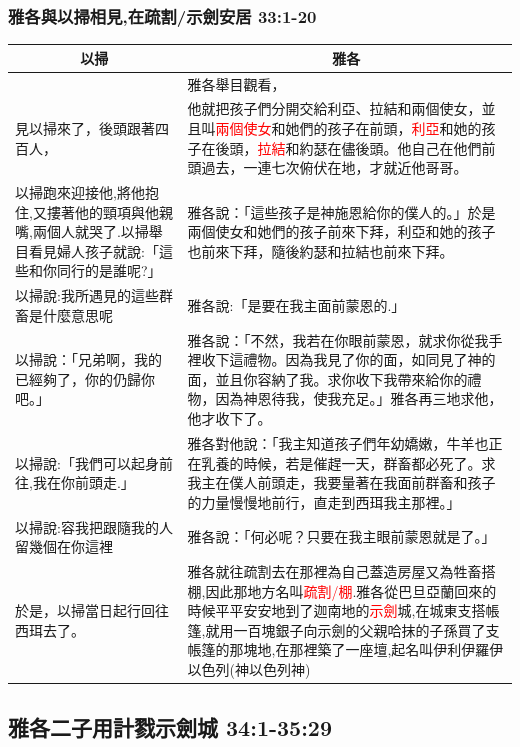 \subsubsection{雅各與以掃相見,在疏割/示劍安居 33:1-20}
\begin{table}[H]
\centering
\begin{tabular}{p{6.5cm}|p{}}\hline\hline
\multicolumn{1}{c|}{以掃}&\multicolumn{1}{c}{雅各}\\\hline
&雅各舉目觀看，\\\hline
見以掃來了，後頭跟著四百人，&他就把孩子們分開交給利亞、拉結和兩個使女，並且叫\textcolor{red}{兩個使女}和她們的孩子在前頭，\textcolor{red}{利亞}和她的孩子在後頭，\textcolor{red}{拉結}和約瑟在儘後頭。他自己在他們前頭過去，一連七次俯伏在地，才就近他哥哥。\\\hline
以掃跑來迎接他,將他抱住,又摟著他的頸項與他親嘴,兩個人就哭了.以掃舉目看見婦人孩子就說:「這些和你同行的是誰呢?」&雅各說：「這些孩子是神施恩給你的僕人的。」於是兩個使女和她們的孩子前來下拜，利亞和她的孩子也前來下拜，隨後約瑟和拉結也前來下拜。\\\hline
\multirow{1}{6.75cm}{以掃說:我所遇見的這些群畜是什麼意思呢}&雅各說:「是要在我主面前蒙恩的.」 \\\hline
以掃說：「兄弟啊，我的已經夠了，你的仍歸你吧。」&雅各說：「不然，我若在你眼前蒙恩，就求你從我手裡收下這禮物。因為我見了你的面，如同見了神的面，並且你容納了我。求你收下我帶來給你的禮物，因為神恩待我，使我充足。」雅各再三地求他，他才收下了。\\\hline
以掃說:「我們可以起身前往,我在你前頭走.」&雅各對他說：「我主知道孩子們年幼嬌嫩，牛羊也正在乳養的時候，若是催趕一天，群畜都必死了。求我主在僕人前頭走，我要量著在我面前群畜和孩子的力量慢慢地前行，直走到西珥我主那裡。」\\\hline
\multirow{1}{6.75cm}{以掃說:容我把跟隨我的人留幾個在你這裡}&雅各說：「何必呢？只要在我主眼前蒙恩就是了。」 \\\hline
於是，以掃當日起行回往西珥去了。&雅各就往疏割去在那裡為自己蓋造房屋又為牲畜搭棚,因此那地方名叫\textcolor{red}{疏割/棚}.雅各從巴旦亞蘭回來的時候平平安安地到了迦南地的\textcolor{red}{示劍}城,在城東支搭帳篷,就用一百塊銀子向示劍的父親哈抹的子孫買了支帳篷的那塊地,在那裡築了一座壇,起名叫伊利伊羅伊以色列(神以色列神)\\\hline
\end{tabular}
\end{table}



\subsection{雅各二子用計戮示劍城 34:1-35:29}
